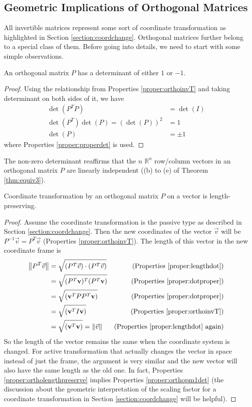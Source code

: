 \subsection{Geometric Implications of Orthogonal Matrices}
\label{section:orthogeometricsub}
All invertible matrices represent some sort of coordinate transformation as highlighted in Section \ref{section:coordchange}. Orthogonal matrices further belong to a special class of them. Before going into details, we need to start with some simple observations.
\begin{proper}
\label{proper:orthopm1det}
An orthogonal matrix $P$ has a determinant of either $1$ or $-1$.
\end{proper}
\begin{proof}
Using the relationship from Properties \ref{proper:orthoinvT} and taking determinant on both sides of it, we have
\begin{align*}
\det(P^TP) &= \det(I) \\
\det(P^T)\det(P) = (\det(P))^2 &= 1\\
\det(P) &= \pm 1
\end{align*}
where Properties \ref{proper:properdet} is used.    
\end{proof} 
The non-zero determinant reaffirms that the $n$ $\mathbb{R}^n$ row/column vectors in an orthogonal matrix $P$ are linearly independent ((b) to (e) of Theorem \ref{thm:equiv3}). 
\begin{proper}
\label{proper:ortholengthpreserve}
Coordinate transformation by an orthogonal matrix $P$ on a vector is length-preserving.
\end{proper}
\begin{proof}
Assume the coordinate transformation is the passive type as described in Section \ref{section:coordchange}. Then the new coordinates of the vector $\vec{v}$ will be $P^{-1}\vec{v} = P^T\vec{v}$ (Properties \ref{proper:orthoinvT}). The length of this vector in the new coordinate frame is
\begin{align*}
\norm{P^T\vec{v}} &= \sqrt{(P^T\vec{v})\cdot(P^T\vec{v})} & \text{(Properties \ref{proper:lengthdot})} \\
&= \sqrt{(P^T\textbf{v})^T(P^T\textbf{v})} & \text{(Properties \ref{proper:dotproper})}\\
&= \sqrt{(\textbf{v}^T PP^T \textbf{v})} & \text{(Properties \ref{proper:dotproper})} \\
&= \sqrt{(\textbf{v}^T I \textbf{v})} & \text{(Properties \ref{proper:orthoinvT})} \\
&= \sqrt{(\textbf{v}^T\textbf{v})} = \norm{\vec{v}} & \text{(Properties \ref{proper:lengthdot} again)}
\end{align*}
So the length of the vector remains the same when the coordinate system is changed. For active transformation that actually changes the vector in space instead of just the frame, the argument is very similar and the new vector will also have the same length as the old one. In fact, Properties \ref{proper:ortholengthpreserve} implies Properties \ref{proper:orthopm1det} (the discussion about the geometric interpretation of the scaling factor for a coordinate transformation in Section \ref{section:coordchange} will be helpful).
\end{proof}


